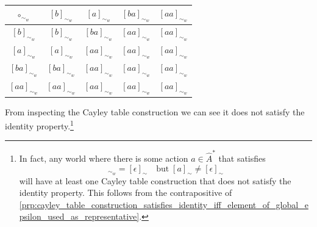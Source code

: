 \begin{proofE}
\begin{enumerate}
    \begin{table}[H]
        \centering
        \begin{tabular}{c|cccc}
            $\circ_{\sim_{w}}$  & $[b]_{\sim_{w}}$  & $[a]_{\sim_{w}}$   & $[ba]_{\sim_{w}}$  & $[aa]_{\sim_{w}}$ \\
            \hline
            $[b]_{\sim_{w}}$    & $[b]_{\sim_{w}}$  & $[ba]_{\sim_{w}}$  & $[aa]_{\sim_{w}}$  & $[aa]_{\sim_{w}}$ \\
            $[a]_{\sim_{w}}$    & $[a]_{\sim_{w}}$  & $[aa]_{\sim_{w}}$  & $[aa]_{\sim_{w}}$  & $[aa]_{\sim_{w}}$ \\
            $[ba]_{\sim_{w}}$   & $[ba]_{\sim_{w}}$ & $[aa]_{\sim_{w}}$  & $[aa]_{\sim_{w}}$  & $[aa]_{\sim_{w}}$ \\
            $[aa]_{\sim_{w}}$   & $[aa]_{\sim_{w}}$ & $[aa]_{\sim_{w}}$  & $[aa]_{\sim_{w}}$  & $[aa]_{\sim_{w}}$
        \end{tabular}
        \caption{
        }
    \end{table}
    From inspecting the Cayley table construction we can see it does not satisfy the identity property.\footnote{
    In fact, any world where there is some action $a \in \hat{A}^{*}$ that satisfies
    \begin{equation}
        [a]_{\sim_{w}} = [\epsilon]_{\sim} \quad \text{but} \; [a]_{\sim} \neq [\epsilon]_{\sim}
    \end{equation}
    will have at least one Cayley table construction that does not satisfy the identity property.
    This follows from the contrapositive of \cref{prp:cayley_table_construction_satisfies_identity_iff_element_of_global_epsilon_used_as_representative}.
    }
\end{enumerate}
\end{proofE}



